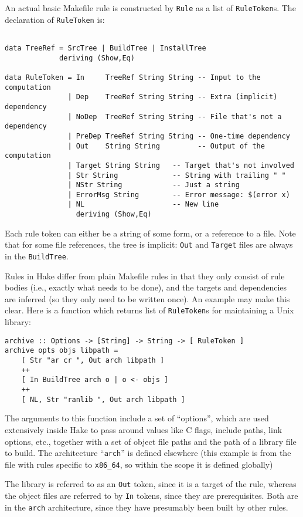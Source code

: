 \documentclass[a4paper,twoside]{report} %
\begin{document}
An actual basic Makefile rule is constructed by \texttt{Rule} as a
list of \texttt{RuleToken}s.  The declaration of \texttt{RuleToken}
is:
\begin{verbatim}

data TreeRef = SrcTree | BuildTree | InstallTree
             deriving (Show,Eq)

data RuleToken = In     TreeRef String String -- Input to the computation
               | Dep    TreeRef String String -- Extra (implicit) dependency
               | NoDep  TreeRef String String -- File that's not a dependency
               | PreDep TreeRef String String -- One-time dependency
               | Out    String String         -- Output of the computation
               | Target String String   -- Target that's not involved
               | Str String             -- String with trailing " "
               | NStr String            -- Just a string
               | ErrorMsg String        -- Error message: $(error x)
               | NL                     -- New line
                 deriving (Show,Eq)
\end{verbatim}
Each rule token can either be a string of some form, or a reference to
a file.   Note that for some file references, the tree is implicit:
\texttt{Out} and \texttt{Target} files are always in the
\texttt{BuildTree}.

Rules in Hake differ from plain Makefile rules in that
they only consist of rule bodies (i.e., exactly what needs to be
done), and the targets and dependencies are inferred (so they only
need to be written once).  An example may make this clear.  Here is a
function which returns list of \texttt{RuleToken}s for maintaining a
Unix library:
\begin{verbatim}
archive :: Options -> [String] -> String -> [ RuleToken ]
archive opts objs libpath =
    [ Str "ar cr ", Out arch libpath ] 
    ++ 
    [ In BuildTree arch o | o <- objs ]
    ++ 
    [ NL, Str "ranlib ", Out arch libpath ]
\end{verbatim}
The arguments to this function include a set of ``options'', which are
used extensively inside Hake to pass around values like C flags,
include paths, link options, etc., together with a set of object file
paths and the path of a library file to build.  The architecture
``\texttt{arch}'' is defined elsewhere (this example is from the file
with rules specific to \texttt{x86\_64}, so within the scope it is
defined globally)

The library is referred to as an \texttt{Out} token, since it is a target
of the rule, whereas the object files are referred to by \texttt{In}
tokens, since they are prerequisites.   Both are in the \texttt{arch}
architecture, since they have presumably been built by other rules. 
\end{document}
